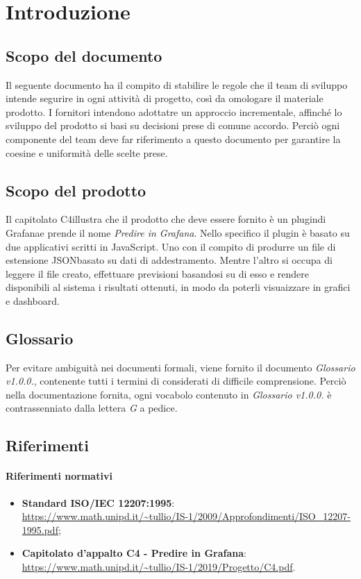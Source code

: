 \section{Introduzione}

\subsection{Scopo del documento}
Il seguente documento ha il compito di stabilire le regole che il team di sviluppo intende segurire in ogni attività di progetto, così da omologare il materiale prodotto.
I fornitori intendono adottatre un approccio incrementale\glo, affinché lo sviluppo del prodotto si basi su decisioni prese di comune accordo. Perciò ogni componente del team deve far riferimento a questo documento per garantire la coesine e uniformità delle scelte prese.

\subsection{Scopo del prodotto}
Il capitolato {C4}\glo illustra che il prodotto che deve essere fornito è un plugin\glo    di Grafana\glo e prende il nome \textit{Predire in Grafana}. Nello specifico il plugin è basato su due applicativi scritti in JavaScript\glo. Uno con il compito di produrre un file  di estensione JSON\glo basato su dati di addestramento\glo{}. Mentre l'altro  si occupa di leggere il file creato, effettuare previsioni basandosi su di esso e rendere disponibili al sistema i risultati ottenuti, in modo da poterli 	visuaizzare in grafici e dashboard.
\subsection{Glossario}
Per evitare ambiguità nei documenti formali, viene fornito il documento \textit{Glossario v1.0.0.}, contenente tutti i termini di considerati di difficile comprensione. Perciò nella documentazione fornita, ogni vocabolo contenuto in \textit{Glossario v1.0.0.} è contrassenniato dalla lettera \textit{G} a pedice.
\subsection{Riferimenti}
\paragraph{Riferimenti normativi}
\begin{itemize}
	\item \textbf{Standard ISO/IEC 12207:1995}: \\
	\url{https://www.math.unipd.it/~tullio/IS-1/2009/Approfondimenti/ISO_12207-1995.pdf};
	\item \textbf{Capitolato d'appalto C4 - Predire in Grafana}: \\
	\url{https://www.math.unipd.it/~tullio/IS-1/2019/Progetto/C4.pdf}.	
\end{itemize}
